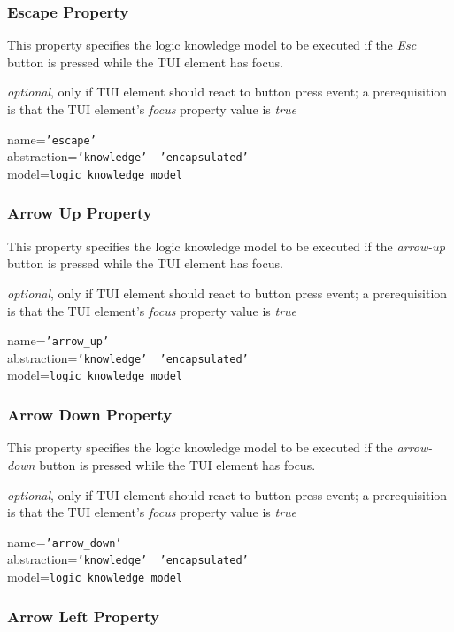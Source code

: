 \subsubsection{Escape Property}

This property specifies the logic knowledge model to be executed if the
\emph{Esc} button is pressed while the TUI element has focus.

\emph{optional}, only if TUI element should react to button press event;
a prerequisition is that the TUI element's \emph{focus} property value is \emph{true}

name=\texttt{'escape'}\\
abstraction=\texttt{'knowledge' \vline\ 'encapsulated'}\\
model=\texttt{logic knowledge model}

\subsubsection{Arrow Up Property}

This property specifies the logic knowledge model to be executed if the
\emph{arrow-up} button is pressed while the TUI element has focus.

\emph{optional}, only if TUI element should react to button press event;
a prerequisition is that the TUI element's \emph{focus} property value is \emph{true}

name=\texttt{'arrow\_up'}\\
abstraction=\texttt{'knowledge' \vline\ 'encapsulated'}\\
model=\texttt{logic knowledge model}

\subsubsection{Arrow Down Property}

This property specifies the logic knowledge model to be executed if the
\emph{arrow-down} button is pressed while the TUI element has focus.

\emph{optional}, only if TUI element should react to button press event;
a prerequisition is that the TUI element's \emph{focus} property value is \emph{true}

name=\texttt{'arrow\_down'}\\
abstraction=\texttt{'knowledge' \vline\ 'encapsulated'}\\
model=\texttt{logic knowledge model}

\subsubsection{Arrow Left Property}

